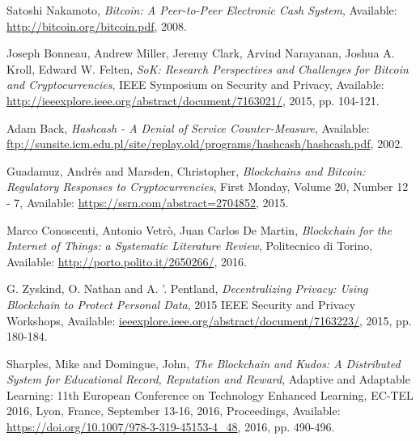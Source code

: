 %
%
%
\begin{thebibliography}{1}

  Satoshi Nakamoto,
  \emph{Bitcoin: A Peer-to-Peer Electronic Cash System},
  Available: \url{http://bitcoin.org/bitcoin.pdf},
  2008.

  Joseph Bonneau, Andrew Miller, Jeremy Clark, Arvind Narayanan, Joshua
A. Kroll, Edward W. Felten,
  \emph{SoK: Research Perspectives and Challenges for Bitcoin and
Cryptocurrencies},
  IEEE Symposium on Security and Privacy,
  Available: \url{http://ieeexplore.ieee.org/abstract/document/7163021/},
  2015, pp. 104-121.

  Adam Back,
  \emph{Hashcash - A Denial of Service Counter-Measure},
  Available:
\url{ftp://sunsite.icm.edu.pl/site/replay.old/programs/hashcash/hashcash.pdf},
  2002.

  Guadamuz, Andrés and Marsden, Christopher,
  \emph{Blockchains and Bitcoin: Regulatory Responses to Cryptocurrencies},
  First Monday, Volume 20, Number 12 - 7,
  Available: \url{https://ssrn.com/abstract=2704852},
  2015.

  Marco Conoscenti, Antonio Vetrò, Juan Carlos De Martin,
  \emph{Blockchain for the Internet of Things: a Systematic Literature Review},
  Politecnico di Torino,
  Available: \url{http://porto.polito.it/2650266/},
  2016.

  G. Zyskind, O. Nathan and A. '. Pentland,
  \emph{Decentralizing Privacy: Using Blockchain to Protect Personal Data},
  2015 IEEE Security and Privacy Workshops,
  Available: \url{ieeexplore.ieee.org/abstract/document/7163223/},
  2015, pp. 180-184.

  Sharples, Mike and Domingue, John,
  \emph{The Blockchain and Kudos: A Distributed System for Educational Record,
Reputation and Reward},
  Adaptive and Adaptable Learning: 11th European Conference on Technology
Enhanced Learning, EC-TEL 2016, Lyon, France, September 13-16, 2016,
Proceedings,
  Available: \url{https://doi.org/10.1007/978-3-319-45153-4_48},
  2016, pp. 490-496.


\end{thebibliography}
